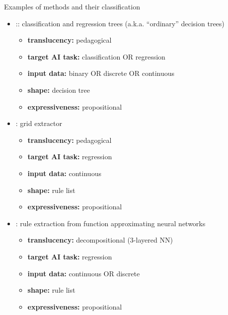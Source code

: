 \documentclass[presentation]{beamer}\mode<presentation>{\usetheme{AMSBolognaFC}}
\begin{document}
\begin{frame}[allowframebreaks]{Examples of methods and their classification}
    \begin{itemize}
        \item \textbf{\cart}:: classification and regression trees (a.k.a. ``ordinary'' decision trees)
        \begin{itemize}
            \item \textbf{translucency:} pedagogical
            \item \textbf{target AI task:} classification OR regression
            \item \textbf{input data:} binary OR discrete OR continuous
            \item \textbf{shape:} decision tree
            \item \textbf{expressiveness:} propositional
        \end{itemize}

        \framebreak

        \item \textbf{\gridex}: grid extractor
        \begin{itemize}
            \item \textbf{translucency:} pedagogical
            \item \textbf{target AI task:} regression
            \item \textbf{input data:} continuous
            \item \textbf{shape:} rule list
            \item \textbf{expressiveness:} propositional
        \end{itemize}

        \framebreak

        \item \textbf{}: rule extraction from function approximating neural networks 
        \begin{itemize}
            \item \textbf{translucency:} decompositional (3-layered NN)
            \item \textbf{target AI task:} regression
            \item \textbf{input data:} continuous OR discrete
            \item \textbf{shape:} rule list
            \item \textbf{expressiveness:} propositional
        \end{itemize}
    \end{itemize}
\end{frame}
\end{document}
